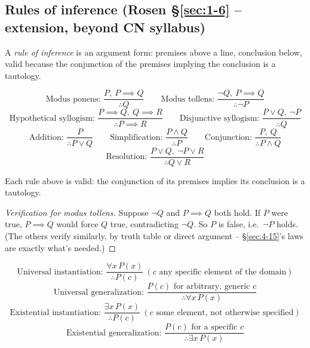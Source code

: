 \documentclass[11pt]{article}
\begin{document}
\subsection{Rules of inference (Rosen \S\ref{sec:1-6} -- extension, beyond CN syllabus)}

\begin{definition}
A \emph{rule of inference} is an argument form: premises above a line, conclusion below, valid because the conjunction of the premises implying the conclusion is a tautology.
\end{definition}

\begin{note}
\[
\text{Modus ponens: } \frac{P,\ P\implies Q}{\therefore Q}
\qquad
\text{Modus tollens: } \frac{\neg Q,\ P\implies Q}{\therefore \neg P}
\]
\[
\text{Hypothetical syllogism: } \frac{P\implies Q,\ Q\implies R}{\therefore P\implies R}
\qquad
\text{Disjunctive syllogism: } \frac{P\vee Q,\ \neg P}{\therefore Q}
\]
\[
\text{Addition: } \frac{P}{\therefore P\vee Q}
\qquad
\text{Simplification: } \frac{P\wedge Q}{\therefore P}
\qquad
\text{Conjunction: } \frac{P,\ Q}{\therefore P\wedge Q}
\]
\[
\text{Resolution: } \frac{P\vee Q,\ \neg P\vee R}{\therefore Q\vee R}
\]
\end{note}

\begin{theorem}
Each rule above is valid: the conjunction of its premises implies its conclusion is a tautology.
\end{theorem}
\begin{proof}[Verification for modus tollens]
Suppose $\neg Q$ and $P\implies Q$ both hold. If $P$ were true, $P\implies Q$ would force $Q$ true, contradicting $\neg Q$. So $P$ is false, i.e.\ $\neg P$ holds. (The others verify similarly, by truth table or direct argument -- \S\ref{sec:4-15}'s laws are exactly what's needed.)
\end{proof}

\bigskip
\begin{note}
\[
\text{Universal instantiation: } \frac{\forall x\, P(x)}{\therefore P(c)} \ (c \text{ any specific element of the domain})
\]
\[
\text{Universal generalization: } \frac{P(c) \text{ for arbitrary, generic } c}{\therefore \forall x\, P(x)}
\]
\[
\text{Existential instantiation: } \frac{\exists x\, P(x)}{\therefore P(c)} \ (c \text{ some element, not otherwise specified})
\]
\[
\text{Existential generalization: } \frac{P(c) \text{ for a specific } c}{\therefore \exists x\, P(x)}
\]
\end{note}
\end{document}
